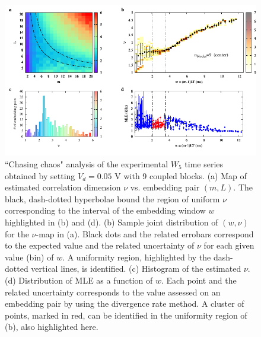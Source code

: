 \begin{figure}[H]
    \centering
    \includegraphics[width=\linewidth]{../blocks/9_blocks/middle/2e5_points/plots/chaos_low.pdf}
    \caption{``Chasing chaos" analysis of the experimental $W_5$ time series obtained by setting $V_d=0.05$ V with 9 coupled blocks.
    (a) Map of estimated correlation dimension $\nu$ vs. embedding pair $(m, L)$.
    The black, dash-dotted hyperbolae bound the region of uniform $\nu$ corresponding to the interval of the
    embedding window $w$ highlighted in (b) and (d).
    (b) Sample joint distribution of $(w,\nu)$ for the $\nu$-map in (a).
    Black dots and the related errobars correspond to the expected value and the related uncertainty of $\nu$
    for each given value (bin) of $w$. A uniformity region, highlighted by the dash-dotted vertical lines,
    is identified. (c) Histogram of the estimated $\nu$. (d) Distribution of MLE as a function of $w$. Each point and the related
    uncertainty corresponds to the value assessed on an embedding pair by using the divergence rate method.
    A cluster of points, marked in red, can be identified in the uniformity region of (b), also highlighted here.}
    \label{fig:9 blocks chaos middle}
\end{figure}


